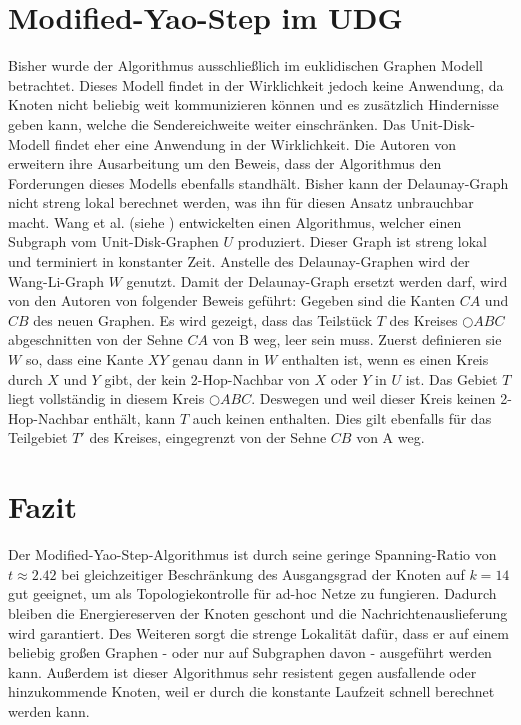 \documentclass[a4paper,twoside]{IEEEtran}
\begin{document}
\section{Modified-Yao-Step im UDG}
Bisher wurde der Algorithmus ausschließlich im euklidischen Graphen Modell betrachtet.
Dieses Modell findet in der Wirklichkeit jedoch keine Anwendung, da Knoten nicht beliebig weit kommunizieren können und es zusätzlich Hindernisse geben kann, welche die Sendereichweite weiter einschränken.
Das Unit-Disk-Modell findet eher eine Anwendung in der Wirklichkeit.
Die Autoren von \cite{kanj} erweitern ihre Ausarbeitung um den Beweis, dass der Algorithmus den Forderungen dieses Modells ebenfalls standhält.
Bisher kann der Delaunay-Graph nicht streng lokal berechnet werden, was ihn für diesen Ansatz unbrauchbar macht.
Wang et al. (siehe \cite{wangLi}) entwickelten einen Algorithmus, welcher einen Subgraph vom Unit-Disk-Graphen $U $ produziert.
Dieser Graph ist streng lokal und terminiert in konstanter Zeit.
Anstelle des Delaunay-Graphen wird der Wang-Li-Graph $W $ genutzt.
Damit der Delaunay-Graph ersetzt werden darf, wird von den Autoren von \cite{kanj} folgender Beweis geführt:
Gegeben sind die Kanten $CA $ und $CB $ des neuen Graphen.
Es wird gezeigt, dass das Teilstück $T $ des Kreises $\bigcirc{ABC} $ abgeschnitten von der Sehne $CA $ von B weg, leer sein muss.
Zuerst definieren sie $W $ so, dass eine Kante $XY $ genau dann in $W $ enthalten ist, wenn es einen Kreis durch $X $ und $Y $ gibt, der kein 2-Hop-Nachbar von $X $ oder $Y $ in $U $ ist.
Das Gebiet $T $ liegt vollständig in diesem Kreis $\bigcirc{ABC} $.
Deswegen und weil dieser Kreis keinen 2-Hop-Nachbar enthält, kann $T $ auch keinen enthalten.
Dies gilt ebenfalls für das Teilgebiet $T' $ des Kreises, eingegrenzt von der Sehne $CB $ von A weg.


\section{Fazit}
Der Modified-Yao-Step-Algorithmus ist durch seine geringe Spanning-Ratio von $t\approx 2.42$ bei gleichzeitiger Beschränkung des Ausgangsgrad der Knoten auf $k=14 $ gut geeignet, um als Topologiekontrolle für ad-hoc Netze zu fungieren.
Dadurch bleiben die Energiereserven der Knoten geschont und die Nachrichtenauslieferung wird garantiert.
Des Weiteren sorgt die strenge Lokalität dafür, dass er auf einem beliebig großen Graphen - oder nur auf Subgraphen davon - ausgeführt werden kann.
Außerdem ist dieser Algorithmus sehr resistent gegen ausfallende oder hinzukommende Knoten, weil er durch die konstante Laufzeit schnell berechnet werden kann.
\end{document}
